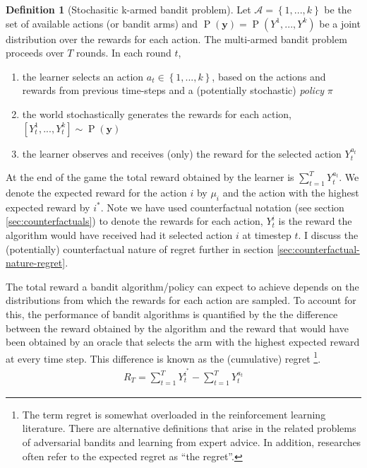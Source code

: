 \documentclass[11pt,a4paper,oneside]{book}
\newcommand{\actionspace}{\mathcal{A}}
\newcommand{\set}[1]{\left\{#1\right\}}
\newcommand{\eqn}[1]{\begin{align}#1\end{align}}
\renewcommand{\P}[1]{\operatorname{P}\left(#1\right)}
\newcommand{\cf}[2]{{#1}^{#2}}
\newcommand{\cfb}[2]{{#1}_t^{#2}} %
\renewcommand{\vec}[1]{\boldsymbol{#1}}
\newcommand{\rawregret}{R_{T}} %
\newcommand{\quotes}[1]{``#1''}
\theoremstyle{plain}
\theoremstyle{definition}
\newtheorem{definition}[theorem]{Definition}
\begin{document}
\vspace{0.5cm}
\begin{definition}[Stochasitic k-armed bandit problem]
Let $\actionspace = \set{1,...,k}$ be the set of available actions (or bandit arms) and $\P{\vec{y}} = \P{\cf{Y}{1},...,\cf{Y}{k}}$ be a joint distribution over the rewards for each action. The multi-armed bandit problem proceeds over $T$ rounds. In each round $t$, 
\begin{enumerate}
\item the learner selects an action $a_{t} \in \set{1,...,k}$, based on the actions and rewards from previous time-steps and a (potentially stochastic) \emph{policy} $\pi$
\item the world stochastically generates the rewards for each action, $[\cfb{Y}{1},...,\cfb{Y}{k}] \sim \P{\vec{y}}$
\item the learner observes and receives (only) the reward for the selected action $\cfb{Y}{a_t}$ 
\end{enumerate}

At the end of the game the total reward obtained by the learner is $\sum_{t=1}^T \cfb{Y}{a_t}$. We denote the expected reward for the action $i$ by $\mu_i$ and the action with the highest expected reward by $i^*$. Note we have used counterfactual notation (see section \ref{sec:counterfactuals}) to denote the rewards for each action, $\cfb{Y}{i}$ is the reward the algorithm would have received had it selected action $i$ at timestep $t$. I discuss the (potentially) counterfactual nature of regret further in section \ref{sec:counterfactual-nature-regret}.
\end{definition} 


The total reward a bandit algorithm/policy can expect to achieve depends on the distributions from which the rewards for each action are sampled. To account for this, the performance of bandit algorithms is quantified by the the difference between the reward obtained by the algorithm and the reward that would have been obtained by an oracle that selects the arm with the highest expected reward at every time step. This difference is known as the (cumulative) regret \footnote{The term regret is somewhat overloaded in the reinforcement learning literature. There are alternative definitions that arise in the related problems of adversarial bandits and learning from expert advice. In addition, researches often refer to the expected regret as \quotes{the regret}.}.
\eqn{
\label{eqn:raw_regret}
\rawregret = \sum_{t=1}^T \cfb{Y}{i^*} - \sum_{t=1}^T \cfb{Y}{a_t}
}
\end{document}
